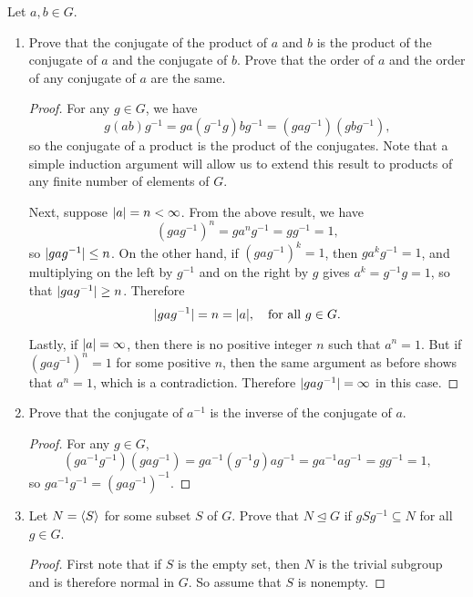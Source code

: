 \label{exercise:quotient-group:conjugate-properties}
Let $a,b\in G$.
\begin{enumerate}
\item Prove that the conjugate of the product of $a$ and $b$ is the
  product of the conjugate of $a$ and the conjugate of $b$. Prove that
  the order of $a$ and the order of any conjugate of $a$ are the same.
  \begin{proof}
    For any $g\in G$, we have
    \begin{equation*}
      g(ab)g^{-1}
      = ga(g^{-1}g)bg^{-1}
      = (gag^{-1})(gbg^{-1}),
    \end{equation*}
    so the conjugate of a product is the product of the
    conjugates. Note that a simple induction argument will allow us to
    extend this result to products of any finite number of elements of
    $G$.

    Next, suppose $\lvert{a}\rvert = n < \infty$. From the above
    result, we have
    \begin{equation*}
      (gag^{-1})^n = ga^ng^{-1} = gg^{-1} = 1,
    \end{equation*}
    so $\lvert{gag^{-1}}\rvert\leq n$. On the other hand, if
    $(gag^{-1})^k = 1$, then $ga^kg^{-1} = 1$, and multiplying on the
    left by $g^{-1}$ and on the right by $g$ gives
    $a^k = g^{-1}g = 1$, so that $\lvert{gag^{-1}}\rvert\geq n$. Therefore
    \begin{equation*}
      \lvert{gag^{-1}}\rvert = n = \lvert{a}\rvert,
      \quad\text{for all $g\in G$}.
    \end{equation*}

    Lastly, if $\lvert{a}\rvert = \infty$, then there is no positive integer
    $n$ such that $a^n = 1$. But if $(gag^{-1})^n = 1$ for some
    positive $n$, then the same argument as before shows that
    $a^n = 1$, which is a contradiction. Therefore
    $\lvert{gag^{-1}}\rvert = \infty$ in this case.
  \end{proof}
\item Prove that the conjugate of $a^{-1}$ is the inverse of the
  conjugate of $a$.
  \begin{proof}
    For any $g\in G$,
    \begin{equation*}
      (ga^{-1}g^{-1})(gag^{-1})
      = ga^{-1}(g^{-1}g)ag^{-1}
      = ga^{-1}ag^{-1}
      = gg^{-1}
      = 1,
    \end{equation*}
    so $ga^{-1}g^{-1} = (gag^{-1})^{-1}$.
  \end{proof}
\item Let $N = \langle{S}\rangle$ for some subset $S$ of $G$. Prove that
  $N\trianglelefteq G$ if $gSg^{-1}\subseteq N$ for all $g\in G$.
  \begin{proof}
    First note that if $S$ is the empty set, then $N$ is the trivial
    subgroup and is therefore normal in $G$. So assume that $S$ is
    nonempty.


\end{proof}
\end{enumerate}
